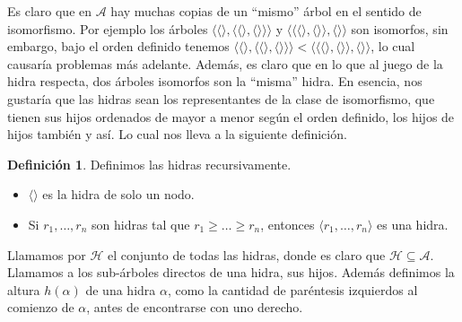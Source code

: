 \documentclass[a4paper,11pt]{article}
\newcommand{\seb}{\subseteq}
\newcommand{\mA}{\mathcal{A}}
\newcommand{\mH}{\mathcal{H}}
\newcommand{\lag}{\langle}
\newcommand{\rag}{\rangle}
\theoremstyle{definition}
\newtheorem{definition}{Definición}
\begin{document}
Es claro que en $\mA$ hay muchas copias de un ``mismo'' árbol en el sentido de isomorfismo. Por ejemplo los
árboles $\lag\lag\rag,\lag\lag\rag,\lag\rag\rag\rag$ y $\lag\lag\lag\rag,\lag\rag\rag,\lag\rag\rag$ son isomorfos,
sin embargo, bajo el orden definido tenemos
$\lag\lag\rag,\lag\lag\rag,\lag\rag\rag\rag < \lag\lag\lag\rag,\lag\rag\rag,\lag\rag\rag$, lo cual causaría
problemas más adelante. Además, es claro
que en lo que al juego de la hidra respecta, dos árboles isomorfos son la ``misma'' hidra.
En esencia, nos gustaría que las hidras
sean los representantes de la clase de isomorfismo, que tienen sus hijos ordenados
de mayor a menor según el orden definido, los hijos de hijos también y así. Lo
cual nos lleva a la siguiente definición.

\begin{definition}
  Definimos las hidras recursivamente.
  \begin{itemize}
    \itemsep0em
    \item $\lag\rag$ es la hidra de solo un nodo.
    \item Si $r_1,\dots,r_n$ son hidras tal que $r_1 \geq \dots \geq r_n$, entonces
      $\lag r_1,\dots,r_n \rag$ es una hidra.
  \end{itemize}
  Llamamos por $\mH$ el conjunto de todas las hidras, donde es claro que $\mH \seb \mA$.\\
  Llamamos a los sub-árboles directos de una hidra, sus hijos. Además
  definimos la altura $h(\alpha)$ de una hidra $\alpha$, como la
  cantidad de paréntesis izquierdos al comienzo de $\alpha$, antes de encontrarse
  con uno derecho.
\end{definition}
\end{document}
